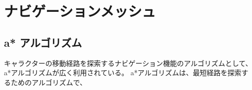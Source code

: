 \section{ナビゲーションメッシュ}
\subsection{a* アルゴリズム}
キャラクターの移動経路を探索するナビゲーション機能のアルゴリズムとして、a*アルゴリズムが広く利用されている。
a*アルゴリズムは、最短経路を探索するためのアルゴリズムで、